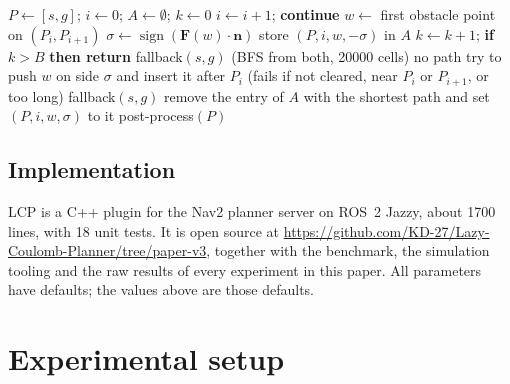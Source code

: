 \documentclass[conference]{IEEEtran}
\newcommand{\lcp}{LCP}
\begin{document}
\begin{algorithm}[t]
\caption{Lazy correction with backtracking}
\label{alg:lcp}
\begin{algorithmic}[1]
\State $P \gets [s, g]$; $i \gets 0$; $A \gets \emptyset$; $k \gets 0$
   $i \gets i + 1$; \textbf{continue}
  \EndIf
  \State $w \gets$ first obstacle point on $(P_i, P_{i+1})$
  \State $\sigma \gets \operatorname{sign}(\mathbf{F}(w)\cdot\mathbf{n})$
  \State store $(P, i, w, -\sigma)$ in $A$
  \Repeat
    \State $k \gets k + 1$; \textbf{if} $k > B$ \textbf{then return} fallback$(s, g)$
    \Statex \hspace{\algorithmicindent}\hspace{\algorithmicindent}(BFS from both, \num{20000} cells)
      \State \Return no path
    \EndIf
    \State try to push $w$ on side $\sigma$ and insert it after $P_i$
    \Statex \hspace{\algorithmicindent}\hspace{\algorithmicindent}(fails if not cleared, near $P_i$ or $P_{i+1}$, or too long)
       \Return fallback$(s, g)$ \EndIf
      \State remove the entry of $A$ with the shortest path
      \Statex \hspace{\algorithmicindent}\hspace{\algorithmicindent}\hspace{\algorithmicindent}and set $(P, i, w, \sigma)$ to it
    \EndIf
\EndWhile
\State \Return post-process$(P)$
\end{algorithmic}
\end{algorithm}

\subsection{Implementation}

\lcp{} is a C++ plugin for the Nav2 planner server on ROS~2 Jazzy, about
\num{1700} lines, with 18 unit tests. It is open source at
\url{https://github.com/KD-27/Lazy-Coulomb-Planner/tree/paper-v3}, together with
the benchmark, the simulation tooling and the raw results of every experiment
in this paper. All parameters have defaults; the values above are those
defaults.

\section{Experimental setup}
\label{sec:setup}
\end{document}
